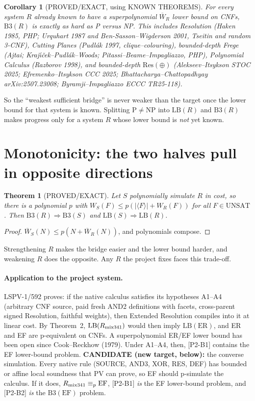 \documentclass[11pt]{article}
\newtheorem{theorem}{Theorem}
\newtheorem{corollary}{Corollary}
\newcommand{\UNSAT}{\mathrm{UNSAT}}
\newcommand{\Wb}{\overline W}
\newcommand{\LB}{\mathrm{LB}}
\newcommand{\Bthree}{\mathrm{B3}}
\begin{document}
\begin{corollary}[PROVED/EXACT, using KNOWN THEOREMS]
For every system $R$ already known to have a superpolynomial $\Wb_R$ lower
bound on CNFs, $\Bthree(R)$ is exactly as hard as P versus NP. This includes
Resolution (Haken 1985, PHP; Urquhart 1987 and Ben-Sasson--Wigderson 2001,
Tseitin and random 3-CNF), Cutting Planes (Pudlák 1997, clique--colouring),
bounded-depth Frege (Ajtai; Kraj\'{\i}\v{c}ek--Pudl\'ak--Woods;
Pitassi--Beame--Impagliazzo, PHP), Polynomial Calculus (Razborov 1998), and
bounded-depth $\mathrm{Res}(\oplus)$ (Alekseev--Itsykson STOC 2025;
Efremenko--Itsykson CCC 2025; Bhattacharya--Chattopadhyay arXiv:2507.23008;
Byramji--Impagliazzo ECCC TR25-118).
\end{corollary}

So the ``weakest sufficient bridge'' is never weaker than the target once
the lower bound for that system is known. Splitting P$\neq$NP into
$\LB(R)$ and $\Bthree(R)$ makes progress only for a system $R$ whose lower
bound is \emph{not} yet known.

\section{Monotonicity: the two halves pull in opposite directions}
\begin{theorem}[PROVED/EXACT]
Let $S$ polynomially simulate $R$ in cost, so there is a polynomial $p$
with $W_S(F)\le p(|\langle F\rangle|+W_R(F))$ for all $F\in\UNSAT$. Then
$\Bthree(R)\Rightarrow\Bthree(S)$ and $\LB(S)\Rightarrow\LB(R)$.
\end{theorem}
\begin{proof}
$\Wb_S(N)\le p(N+\Wb_R(N))$, and polynomials compose.
\end{proof}
Strengthening $R$ makes the bridge easier and the lower bound harder, and
weakening $R$ does the opposite. Any $R$ the project fixes faces this
trade-off.

\paragraph{Application to the project system.}
LSPV-1/592 proves: if the native calculus satisfies its hypotheses A1--A4
(arbitrary CNF source, paid fresh AND2 definitions with facets,
cross-parent signed Resolution, faithful weights), then Extended Resolution
compiles into it at linear cost. By Theorem~2, $\LB(R_{\rm mix341})$ would
then imply $\LB(\mathrm{ER})$, and ER and EF are p-equivalent on CNFs. A
superpolynomial ER/EF lower bound has been open since Cook--Reckhow
(1979). Under A1--A4, then, [P2-B1] contains the EF lower-bound problem.
\textbf{CANDIDATE (new target, below):} the converse simulation. Every
native rule (SOURCE, AND3, XOR, RES, DEF) has bounded or affine
local soundness that PV can prove, so EF should p-simulate the calculus.
If it does, $R_{\rm mix341}\equiv_p\mathrm{EF}$, [P2-B1] \emph{is} the EF
lower-bound problem, and [P2-B2] \emph{is} the $\Bthree(\mathrm{EF})$
problem.
\end{document}
